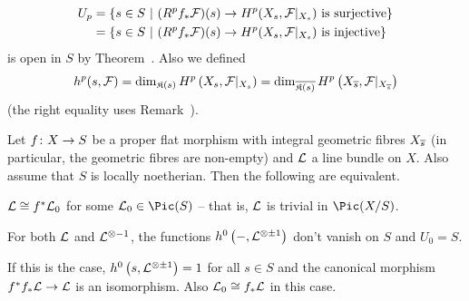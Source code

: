 \documentclass[a4paper,parskip=half,numbers=enddot, DIV=12]{scrreprt}
\begin{document}
\begin{align*}
	U_p&=\left\{s\in S\ \middle|\ (R^pf_*\mathcal{F})(s)\to H^p(X_s,\mathcal{F}|_{X_s})\text{ is surjective}\right\}\\
	&=\left\{s\in S\ \middle|\ (R^pf_*\mathcal{F})(s)\to H^p(X_s,\mathcal{F}|_{X_s})\text{ is injective}\right\}
\end{align*}
is open in $S$ by Theorem~. Also we defined
\begin{align*}
	h^p(s,\mathcal{F})=\dim_{\mathfrak{K}(s)}H^p\left(X_s,\mathcal{F}|_{X_s}\right)=\dim_{\overline{\mathfrak{K}(s)}}H^p\left(X_{\overline{s}},\mathcal{F}|_{X_{\overline{s}}}\right)
\end{align*}
(the right equality uses Remark~).
\begin{prop}
	Let $f\colon X\morphism S$ be a proper flat morphism with integral geometric fibres $X_{\overline{s}}$ (in particular, the geometric fibres are non-empty) and $\mathcal{L}$ a line bundle on $X$. Also assume that $S$ is locally noetherian. Then the following are equivalent.
	\begin{alphanumerate}
		\item $\mathcal{L}\cong f^*\mathcal{L}_0$ for some $\Ll_0\in\Pic(S)$ -- that is, $\mathcal{L}$ is trivial in $\Pic(X/S)$.
		\item For both $\mathcal{L}$ and $\mathcal{L}^{\otimes -1}$, the functions $h^0\left(-,\mathcal{L}^{\otimes \pm 1}\right)$ don't vanish on $S$ and $U_0=S$.
	\end{alphanumerate}
	If this is the case, $h^0\left(s,\mathcal{L}^{\otimes\pm1}\right)=1$ for all $s\in S$ and the canonical morphism $f^*f_*\Ll\morphism\Ll$ is an isomorphism. Also $\mathcal{L}_0\cong f_*\mathcal{L}$ in this case.
\end{prop}
\end{document}
